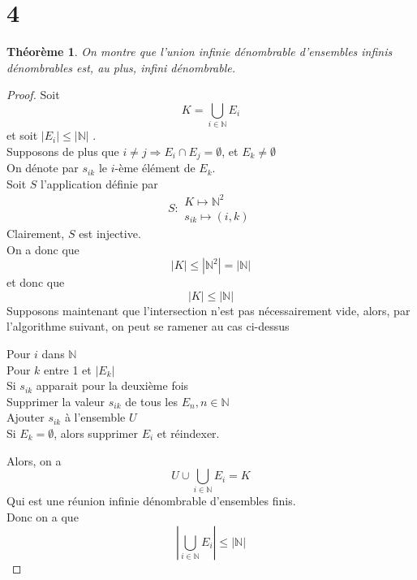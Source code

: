\documentclass[11pt, a4paper, twoside]{article}
\newtheorem{theorem}{Théorème}
\begin{document}
\section*{4}
\begin{theorem}
	On montre que l'union infinie dénombrable d'ensembles infinis dénombrables est, au plus, infini dénombrable.
\end{theorem}
\begin{proof}
Soit
\[ 
K = \bigcup_{i \in \mathbb{N}} E_i
\]
et soit $|E_i| \leq |\mathbb{N}|$ .\\
Supposons de plus que $i \neq j  \Rightarrow E_i \cap E_j = \emptyset$, et $E_k \neq \emptyset$\\
On dénote par $s_{ik}$ le $i$-ème élément de $E_k$.\\
Soit $S$ l'application définie par
\[
S:
\begin{array}{l}
	K \mapsto \mathbb{N}^{2}\\
	s_{ik} \mapsto ( i,k)
\end{array}
\]
Clairement, $S$ est injective.\\
On a donc que
\[ 
|K| \leq |\mathbb{N}^{2}| = |\mathbb{N}|
\]
et donc que
 \[ 
|K| \leq |\mathbb{N}|
\]
Supposons maintenant que l'intersection n'est pas nécessairement vide, alors, par l'algorithme suivant, on peut se ramener au cas ci-dessus
\begin{flushleft}
Pour $i$ dans $\mathbb{N}$ \\
\quad Pour $k$ entre 1 et $|E_k|$ \\
\quad \quad Si $s_{ik}$ apparait pour la deuxième fois\\
\quad \quad Supprimer la valeur $s_{ik} $ de tous les $E_n, n \in \mathbb{N}$\\
\quad \quad Ajouter $s_{ik}$ à l'ensemble $U$\\
\quad \quad Si $E_k = \emptyset$, alors supprimer $E_i$ et réindexer.
\end{flushleft}
Alors, on a
\[ 
U \cup \bigcup_{i \in \mathbb{N}} E_i = K
\]
Qui est une réunion infinie dénombrable d'ensembles finis.\\
Donc on a que
\[ 
|\bigcup_{i \in \mathbb{N}} E_i| \leq |\mathbb{N}|
\]










\end{proof}
\end{document}
